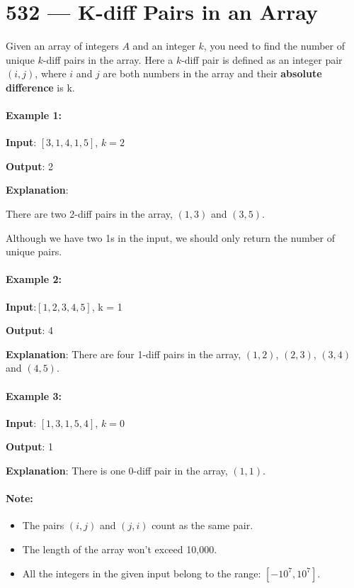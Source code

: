 \section{532 --- K-diff Pairs in an Array}
Given an array of integers $A$ and an integer $ k $, you need to find the number of unique $ k $-diff pairs in the array. Here a $ k $-diff pair is defined as an integer pair $ (i, j) $, where $ i $ and $ j $ are both numbers in the array and their \textbf{absolute difference} is k.

\paragraph{Example 1:}

\begin{flushleft}
\textbf{Input}: $ [3, 1, 4, 1, 5] $, $ k = 2 $

\textbf{Output}: 2

\textbf{Explanation}: 

There are two 2-diff pairs in the array, $ (1, 3) $ and $ (3, 5) $.

Although we have two 1s in the input, we should only return the number of unique pairs.

\end{flushleft}

\paragraph{Example 2:}

\begin{flushleft}
\textbf{Input}:$ [1, 2, 3, 4, 5] $, k = 1

\textbf{Output}: 4

\textbf{Explanation}: There are four 1-diff pairs in the array, $  (1, 2) $, $ (2, 3) $, $ (3, 4) $ and $ (4, 5) $.

\end{flushleft}

\paragraph{Example 3:}
\begin{flushleft}

\textbf{Input}: $ [1, 3, 1, 5, 4] $, $ k = 0 $

\textbf{Output}: 1

\textbf{Explanation}: There is one 0-diff pair in the array, $ (1, 1) $.

\end{flushleft}

\paragraph{Note:}

\begin{itemize}
\item The pairs $(i, j)$ and $(j, i)$ count as the same pair.
\item The length of the array won't exceed 10,000.
\item All the integers in the given input belong to the range: $[-10^7, 10^7]$.
\end{itemize}
